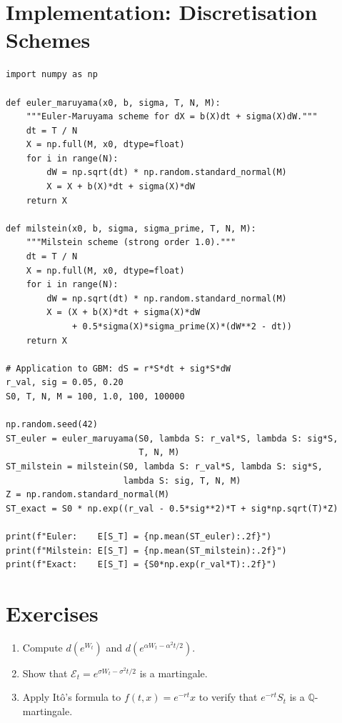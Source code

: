 \section{Implementation: Discretisation Schemes}

\begin{codeblock}[title=\textbf{Euler--Maruyama and Milstein Schemes}]
\begin{verbatim}
import numpy as np

def euler_maruyama(x0, b, sigma, T, N, M):
    """Euler-Maruyama scheme for dX = b(X)dt + sigma(X)dW."""
    dt = T / N
    X = np.full(M, x0, dtype=float)
    for i in range(N):
        dW = np.sqrt(dt) * np.random.standard_normal(M)
        X = X + b(X)*dt + sigma(X)*dW
    return X

def milstein(x0, b, sigma, sigma_prime, T, N, M):
    """Milstein scheme (strong order 1.0)."""
    dt = T / N
    X = np.full(M, x0, dtype=float)
    for i in range(N):
        dW = np.sqrt(dt) * np.random.standard_normal(M)
        X = (X + b(X)*dt + sigma(X)*dW
             + 0.5*sigma(X)*sigma_prime(X)*(dW**2 - dt))
    return X

# Application to GBM: dS = r*S*dt + sig*S*dW
r_val, sig = 0.05, 0.20
S0, T, N, M = 100, 1.0, 100, 100000

np.random.seed(42)
ST_euler = euler_maruyama(S0, lambda S: r_val*S, lambda S: sig*S,
                          T, N, M)
ST_milstein = milstein(S0, lambda S: r_val*S, lambda S: sig*S,
                       lambda S: sig, T, N, M)
Z = np.random.standard_normal(M)
ST_exact = S0 * np.exp((r_val - 0.5*sig**2)*T + sig*np.sqrt(T)*Z)

print(f"Euler:    E[S_T] = {np.mean(ST_euler):.2f}")
print(f"Milstein: E[S_T] = {np.mean(ST_milstein):.2f}")
print(f"Exact:    E[S_T] = {S0*np.exp(r_val*T):.2f}")
\end{verbatim}
\end{codeblock}

\section{Exercises}

\begin{exercise}[It\^o's Formula]
\begin{enumerate}
    \item Compute $d(e^{W_t})$ and $d(e^{\alpha W_t - \alpha^2 t/2})$.
    \item Show that $\mathcal{E}_t = e^{\sigma W_t - \sigma^2 t/2}$ is
          a martingale.
    \item Apply It\^o's formula to $f(t,x) = e^{-rt}x$ to verify that
          $e^{-rt}S_t$ is a $\mathbb{Q}$-martingale.
\end{enumerate}
\end{exercise}

